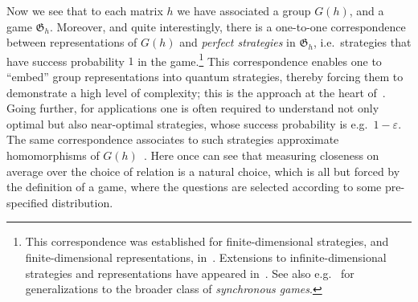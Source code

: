 \documentclass[11pt]{article}
\theoremstyle{definition}
\newcommand{\eps}{\varepsilon}
\newcommand{\game}{\mathfrak{G}}
\begin{document}
Now we see that to each matrix $h$ we have associated a group $G(h)$, and a game $\game_h$. Moreover, and quite interestingly, there is a one-to-one correspondence between representations of $G(h)$ and \emph{perfect strategies} in $\game_h$, i.e.\ strategies that have success probability $1$ in the game.\footnote{This correspondence was established for finite-dimensional strategies, and finite-dimensional representations, in~\cite{cleve2014characterization}. Extensions to infinite-dimensional strategies and representations have appeared in~\cite{cleve2017perfect}. See also e.g.~\cite{kim2018synchronous} for generalizations to the broader class of \emph{synchronous games}.}
This correspondence enables one to ``embed'' group representations into quantum strategies, thereby forcing them to demonstrate a high level of complexity; this is the approach at the heart of~\cite{slofstra2019set}. Going further, for applications one is often required to understand not only optimal but also near-optimal strategies, whose success probability is e.g.\ $1-\eps$. The same correspondence associates to such strategies approximate homomorphisms of $G(h)$~\cite{slofstra2018entanglement}. Here once can see that measuring closeness on average over the choice of relation is a natural choice, which is all but forced by the definition of a game, where the questions are selected according to some pre-specified distribution. 
\end{document}

